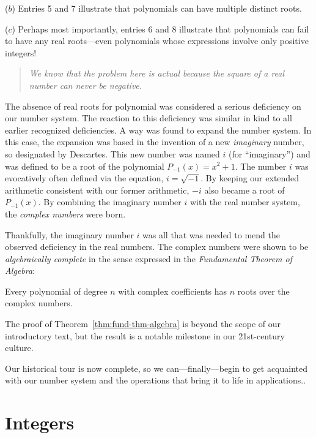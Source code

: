 \noindent
($b$) Entries 5 and 7 illustrate that polynomials can have multiple
distinct roots.

\noindent
($c$) Perhaps most importantly, entries 6 and 8 illustrate that
polynomials can fail to have any real roots---even polynomials whose
expressions involve only positive integers!
\begin{quote}
{\em
We know that the problem here is actual because the square of a real
number can never be negative.
}
\end{quote}
The absence of real roots for polynomial was considered a serious
deficiency on our number system.  The reaction to this deficiency was
similar in kind to all earlier recognized deficiencies.  A way was
found to expand the number system.  In this case, the expansion  was
based in the invention of a new {\it imaginary} number,
so designated by Descartes.  This new number was named $i$
(for ``imaginary'') and was defined to be a root of the polynomial
$P_{-1}(x) = x^2 +1$.  The number $i$ was evocatively often defined
via the equation, $i = \sqrt{-1}$.  By keeping our extended arithmetic
consistent with our former arithmetic, $-i$ also became a root of
$P_{-1}(x)$.  By combining the imaginary number $i$ with the real
number system, the {\it complex numbers} were
born.

Thankfully, the imaginary number $i$ was all that was needed to mend
the observed deficiency in the real numbers.  The complex numbers were
shown to be {\it algebraically complete}
in the sense expressed in the {\it Fundamental Theorem of Algebra}:

\begin{theorem}
\label{thm:fund-thm-algebra}
Every polynomial of degree $n$ with complex coefficients has $n$ roots
over the complex numbers.
\end{theorem}

The proof of Theorem~\ref{thm:fund-thm-algebra} is beyond the scope of
our introductory text, but the result is a notable milestone in our
21st-century culture.

Our historical tour is now complete, so we can---finally---begin to
get acquainted with our number system and the operations that bring it
to life in applications..


\section{Integers}
\label{sec:integers}

